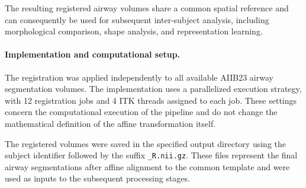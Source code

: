 The resulting registered airway volumes share a common spatial reference and
can consequently be used for subsequent inter-subject analysis, including
morphological comparison, shape analysis, and representation learning.

\paragraph{Implementation and computational setup.}  %

The registration was applied independently to all available AIIB23 airway
segmentation volumes. The implementation uses a parallelized execution
strategy, with 12 registration jobs and 4 ITK threads assigned to each job.
These settings concern the computational execution of the pipeline and do not
change the mathematical definition of the affine transformation itself.

The registered volumes were saved in the specified output directory using the
subject identifier followed by the suffix \texttt{\_R.nii.gz}. These files
represent the final airway segmentations after affine alignment to the common
template and were used as inputs to the subsequent processing stages.
